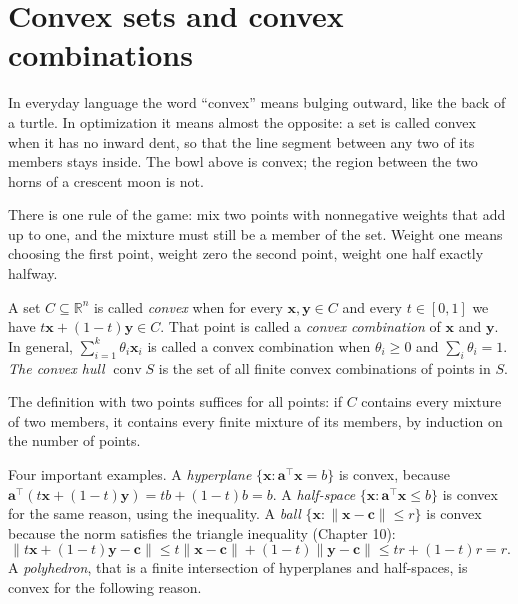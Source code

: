 \section{Convex sets and convex combinations}

In everyday language the word ``convex'' means bulging outward, like the back of a turtle. In
optimization it means almost the opposite: a set is called convex when it has no inward dent,
so that the line segment between any two of its members stays inside. The bowl above is
convex; the region between the two horns of a crescent moon is not.

There is one rule of the game: mix two points with nonnegative weights that add up to one, and
the mixture must still be a member of the set. Weight one means choosing the first point,
weight zero the second point, weight one half exactly halfway.


\begin{definisi}
A set $C\subseteq\mathbb{R}^{n}$ is called \emph{convex} when for every
$\mathbf{x},\mathbf{y}\in C$ and every $t\in[0,1]$ we have
$t\mathbf{x}+(1-t)\mathbf{y}\in C$. That point is called a \emph{convex combination} of
$\mathbf{x}$ and $\mathbf{y}$. In general, $\sum_{i=1}^{k}\theta_{i}\mathbf{x}_{i}$ is called
a convex combination when $\theta_{i}\ge0$ and $\sum_{i}\theta_{i}=1$.
\emph{The convex hull} $\operatorname{conv}S$ is the set of all finite convex combinations of
points in $S$.
\end{definisi}

The definition with two points suffices for all points: if $C$ contains every mixture of two
members, it contains every finite mixture of its members, by induction on the number of
points.

Four important examples. A \emph{hyperplane}
$\{\mathbf{x}:\mathbf{a}^{\top}\mathbf{x}=b\}$ is convex, because
$\mathbf{a}^{\top}(t\mathbf{x}+(1-t)\mathbf{y})=tb+(1-t)b=b$. A \emph{half-space}
$\{\mathbf{x}:\mathbf{a}^{\top}\mathbf{x}\le b\}$ is convex for the same reason, using the
inequality. A \emph{ball} $\{\mathbf{x}:\|\mathbf{x}-\mathbf{c}\|\le r\}$ is convex because
the norm satisfies the triangle inequality (Chapter 10):
\[
  \|t\mathbf{x}+(1-t)\mathbf{y}-\mathbf{c}\|
  \le t\|\mathbf{x}-\mathbf{c}\|+(1-t)\|\mathbf{y}-\mathbf{c}\|\le tr+(1-t)r=r .
\]
A \emph{polyhedron}, that is a finite intersection of hyperplanes and half-spaces, is convex
for the following reason.

